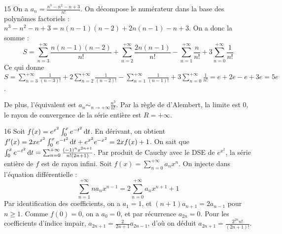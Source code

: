 \begin{correction}{15}
On a $a_n = \frac{n^3-n^2-n+3}{n!}$. 
On décompose le numérateur dans la base des polynômes factoriels : 
$n^3-n^2-n+3 = n(n-1)(n-2) + 2n(n-1) - n + 3$. 
On a donc la somme :
$$ S = \sum_{n=3}^{+\infty} \frac{n(n-1)(n-2)}{n!} + \sum_{n=2}^{+\infty} \frac{2n(n-1)}{n!} - \sum_{n=1}^{+\infty} \frac{n}{n!} + 3\sum_{n=0}^{+\infty} \frac{1}{n!} $$ 
Ce qui donne $S = \sum_{n=3}^{+\infty} \frac{1}{(n-3)!} + 2\sum_{n=2}^{+\infty} \frac{1}{(n-2)!} - \sum_{n=1}^{+\infty} \frac{1}{(n-1)!} + 3\sum_{n=0}^{+\infty} \frac{1}{n!} = e + 2e - e + 3e = 5e$. 

De plus, l'équivalent est $a_n \sim_{n \to +\infty} \frac{n^3}{n!}$. 
Par la règle de d'Alembert, la limite est 0, le rayon de convergence de la série entière est $R = +\infty$. 
\end{correction}

\begin{correction}{16}
Soit $f(x) = e^{x^2} \int_0^x e^{-t^2} \,\mathrm{d}t$. 
En dérivant, on obtient $f'(x) = 2x e^{x^2} \int_0^x e^{-t^2} \,\mathrm{d}t + e^{x^2}e^{-x^2} = 2x f(x) + 1$. 
On sait que $\int_0^x e^{-t^2} \,\mathrm{d}t = \sum_{n=0}^{+\infty} \frac{(-1)^n x^{2n+1}}{n!(2n+1)}$. 
Par produit de Cauchy avec le DSE de $e^{x^2}$, la série entière de $f$ est de rayon infini. 
Soit $f(x) = \sum_{n=0}^{+\infty} a_n x^n$. On injecte dans l'équation différentielle : 
$$ \sum_{n=1}^{+\infty} n a_n x^{n-1} = 2 \sum_{n=0}^{+\infty} a_n x^{n+1} + 1 $$ 
Par identification des coefficients, on a $a_1 = 1$, et $(n+1)a_{n+1} = 2a_{n-1}$ pour $n \ge 1$. 
Comme $f(0)=0$, on a $a_0 = 0$, et par récurrence $a_{2n}=0$. 
Pour les coefficients d'indice impair, $a_{2n+1} = \frac{2}{2n+1} a_{2n-1}$, d'où on déduit $a_{2n+1} = \frac{2^{2n} n!}{(2n+1)!}$. 
\end{correction}

